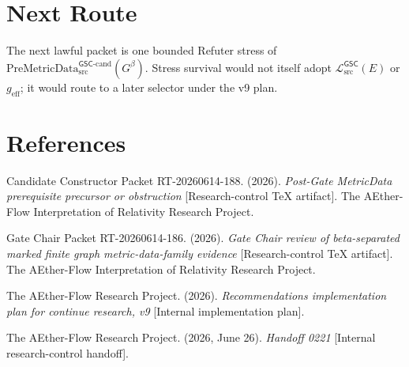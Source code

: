 \documentclass[11pt]{article}
\newcommand{\PreMetricData}{\mathrm{PreMetricData}_{\mathrm{src}}^{\mathsf{GSC}\mbox{-}\mathrm{cand}}}
\newcommand{\MetricData}{\mathcal{L}_{\mathrm{src}}^{\mathsf{GSC}}}
\newcommand{\Gbeta}{G^\beta}
\newcommand{\geff}{g_{\mathrm{eff}}}
\begin{document}
\section{Next Route}

The next lawful packet is one bounded Refuter stress of
\(\PreMetricData(\Gbeta)\). Stress survival would not itself adopt
\(\MetricData(E)\) or \(\geff\); it would route to a later selector under the
v9 plan.

\section{References}

Candidate Constructor Packet RT-20260614-188. (2026). \textit{Post-Gate
MetricData prerequisite precursor or obstruction} [Research-control TeX
artifact]. The AEther-Flow Interpretation of Relativity Research Project.

Gate Chair Packet RT-20260614-186. (2026). \textit{Gate Chair review of
beta-separated marked finite graph metric-data-family evidence}
[Research-control TeX artifact]. The AEther-Flow Interpretation of Relativity
Research Project.

The AEther-Flow Research Project. (2026). \textit{Recommendations
implementation plan for continue research, v9} [Internal implementation
plan].

The AEther-Flow Research Project. (2026, June 26). \textit{Handoff 0221}
[Internal research-control handoff].
\end{document}
